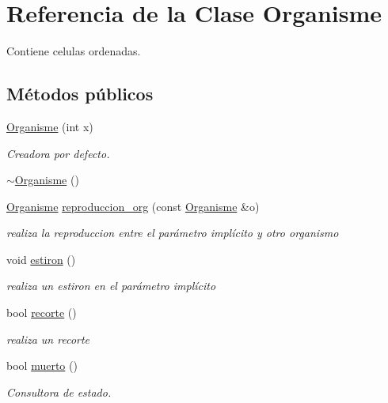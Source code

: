\hypertarget{class_organisme}{\section{Referencia de la Clase Organisme}
\label{class_organisme}
}


Contiene celulas ordenadas.  


\subsection*{Métodos públicos}
\begin{DoxyCompactItemize}
\item 
\hyperlink{class_organisme_a86e18d319ceca9bb5fd43ac630c78b40}{Organisme} (int x)
\begin{DoxyCompactList}\small\item\em Creadora por defecto. \end{DoxyCompactList}\item 
\hyperlink{class_organisme_a55c9d7cbc9683970ad88455fdc3be7aa}{$\sim$\-Organisme} ()
\item 
\hyperlink{class_organisme}{Organisme} \hyperlink{class_organisme_a589195c1a83c096fcd7487a8b9a8a0a7}{reproduccion\-\_\-org} (const \hyperlink{class_organisme}{Organisme} \&o)
\begin{DoxyCompactList}\small\item\em realiza la reproduccion entre el parámetro implícito y otro organismo \end{DoxyCompactList}\item 
void \hyperlink{class_organisme_acdc2be53a7fabf324235c19b313bf662}{estiron} ()
\begin{DoxyCompactList}\small\item\em realiza un estiron en el parámetro implícito \end{DoxyCompactList}\item 
bool \hyperlink{class_organisme_a1f97e234776174573cfb761e7697dc37}{recorte} ()
\begin{DoxyCompactList}\small\item\em realiza un recorte \end{DoxyCompactList}\item 
bool \hyperlink{class_organisme_a6428a0fc8326f50acbdf24f6a134e60b}{muerto} ()
\begin{DoxyCompactList}\small\item\em Consultora de estado. \end{DoxyCompactList}\item 

\end{DoxyCompactItemize}
